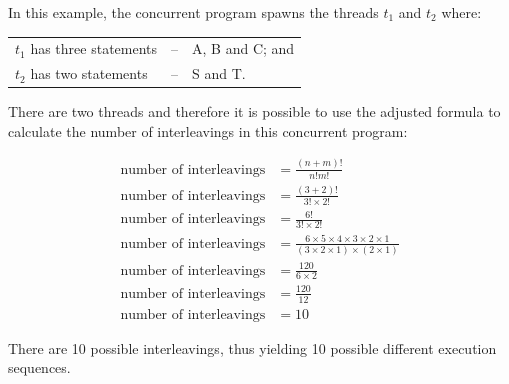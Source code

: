 \documentclass[a4paper]{systems-software}
\begin{document}
In this example, the concurrent program spawns the threads $t_{1}$ and $t_{2}$ where:
\begin{longtabu} to \textwidth { X[1.5,l] X[0.2,l] X[3,l]}
	\textbullet $t_{1}$ has three statements & -- &
	A, B and C; and
	\\
	\textbullet $t_{2}$ has two statements & -- &
	S and T.
\end{longtabu}

There are two threads and therefore it is possible to use the adjusted formula to calculate the number of interleavings in this concurrent program:

\begin{equation*}
	\begin{aligned}
		\text{number of interleavings} & = \frac{(n + m)!}{n!m!} \\
		\text{number of interleavings} & = \frac{(3 + 2)!}{3! \times 2!} \\
		\text{number of interleavings} & = \frac{6!}{3! \times 2!} \\
		\text{number of interleavings} & = \frac{6\times5\times4\times3\times2\times1}{(3\times2\times1)\times(2\times1)} \\
		\text{number of interleavings} & = \frac{120}{6\times2} \\
		\text{number of interleavings} & = \frac{120}{12} \\
		\text{number of interleavings} & = 10
	\end{aligned}
\end{equation*}

There are 10 possible interleavings, thus yielding 10 possible different execution sequences.
\end{document}
